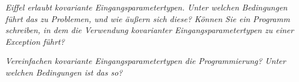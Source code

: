 \documentclass[a4paper,10pt]{article}
\begin{document}
\vspace{3mm}


\emph{Eiffel erlaubt kovariante Eingangsparametertypen. Unter welchen Bedingungen 
führt das zu Problemen, und wie äußern sich diese? Können Sie ein Programm 
schreiben, in dem die Verwendung kovarianter Eingangsparametertypen zu einer 
Exception führt?}

\vspace{3mm}


\emph{Vereinfachen kovariante Eingangsparametertypen die Programmierung? Unter 
welchen Bedingungen ist das so?}

\vspace{3mm}

\begin{comment}
Von OOP: Mehrfach dynamisches Binden, Multimethoden.
\end{comment}
\end{document}
